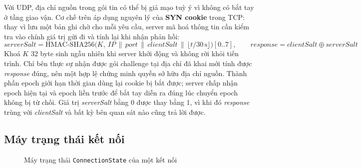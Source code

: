 Với UDP, địa chỉ nguồn trong gói tin có thể bị giả mạo tuỳ ý vì không có bắt tay ở tầng giao vận. Cơ chế trên áp
dụng nguyên lý của \textbf{SYN cookie} trong TCP: thay vì lưu một bản ghi chờ cho mỗi yêu cầu, server mã hoá thông tin
cần kiểm tra vào chính giá trị gửi đi và tính lại khi nhận phản hồi:
\[
  \mathit{serverSalt} = \mbox{HMAC-SHA256}\big(K,\ \mathit{IP} \,\|\, \mathit{port} \,\|\, \mathit{clientSalt}
  \,\|\, \lfloor t / 30\,\mathrm{s} \rfloor\big)[0..7], \qquad
  \mathit{response} = \mathit{clientSalt} \oplus \mathit{serverSalt}
\]
Khoá $K$ 32 byte sinh ngẫu nhiên khi server khởi động và không rời khỏi tiến trình. Chỉ bên thực sự nhận được gói
challenge tại địa chỉ đã khai mới tính được \textit{response} đúng, nên một  hợp lệ chứng minh quyền
sở hữu địa chỉ nguồn. Thành phần epoch giới hạn thời gian dùng lại cookie bị bắt được; server chấp nhận epoch hiện tại
và epoch liền trước để bắt tay diễn ra đúng lúc chuyển epoch không bị từ chối. Giá trị \textit{serverSalt} bằng 0 được
thay bằng 1, vì khi đó \textit{response} trùng với \textit{clientSalt} và bất kỳ bên quan sát nào cũng trả lời được.

\subsection{Máy trạng thái kết nối}
\begin{figure}[H]
\centering
{}
\caption{Máy trạng thái \texttt{ConnectionState} của một kết nối}
\label{fig:B-trangthai}
\end{figure}

